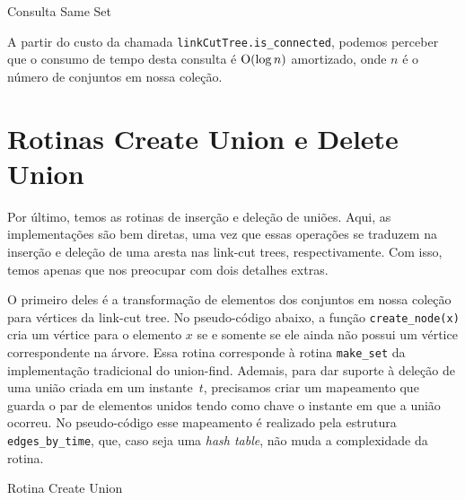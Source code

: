 \begin{algorithm}[h!]
    \caption{Consulta Same Set}\label{uf:same-set}
    \begin{algorithmic}[1]
        \State {}
        \EndIf
        \State {}
        \EndFunction
    \end{algorithmic}
\end{algorithm}

A partir do custo da chamada \texttt{linkCutTree.is\_connected}, podemos perceber que o consumo de tempo desta consulta é $\mathrm{O}(\log n)$ amortizado, onde $n$ é o número de conjuntos em nossa coleção.

\section{Rotinas Create Union e Delete Union}
\label{sec:uf-union}

Por último, temos as rotinas de inserção e deleção de uniões. Aqui, as implementações são bem diretas, uma vez que essas operações se traduzem na inserção e deleção de uma aresta nas link-cut trees, respectivamente. Com isso, temos apenas que nos preocupar com dois detalhes extras.

O primeiro deles é a transformação de elementos dos conjuntos em nossa coleção para vértices da link-cut tree. No pseudo-código abaixo, a função \texttt{create\_node(x)} cria um vértice para o elemento $x$ se e somente se ele ainda não possui um vértice correspondente na árvore. Essa rotina corresponde à rotina \texttt{make\_set} da implementação tradicional do union-find. Ademais, para dar suporte à deleção de uma união criada em um instante~$t$, precisamos criar um mapeamento que guarda o par de elementos unidos tendo como chave o instante em que a união ocorreu. No pseudo-código esse mapeamento é realizado pela estrutura \texttt{edges\_by\_time}, que, caso seja uma \emph{hash table}, não muda a complexidade da rotina.

\begin{algorithm}[h!]
    \caption{Rotina Create Union}\label{uf:create-union}
    \begin{algorithmic}[1]
        \EndFunction
    \end{algorithmic}
\end{algorithm}

